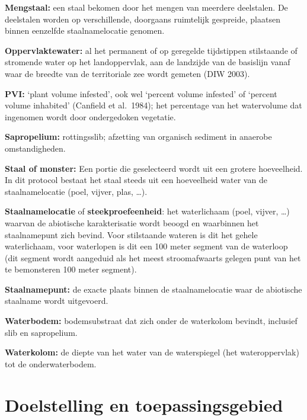 \documentclass[
]{scrreprt}
\begin{document}
\textbf{Mengstaal:} een staal bekomen door het mengen van meerdere deelstalen. De deelstalen worden op verschillende, doorgaans ruimtelijk gespreide, plaatsen binnen eenzelfde staalnamelocatie genomen.

\textbf{Oppervlaktewater:} al het permanent of op geregelde tijdstippen stilstaande of stromende water op het landoppervlak, aan de landzijde van de basislijn vanaf waar de breedte van de territoriale zee wordt gemeten (DIW 2003).

\textbf{PVI:} `plant volume infested', ook wel `percent volume infested' of `percent volume inhabited' (Canfield et al.~1984); het percentage van het watervolume dat ingenomen wordt door ondergedoken vegetatie.

\textbf{Sapropelium:} rottingsslib; afzetting van organisch sediment in anaerobe omstandigheden.

\textbf{Staal of monster:} Een portie die geselecteerd wordt uit een grotere hoeveelheid. In dit protocol bestaat het staal steeds uit een hoeveelheid water van de staalnamelocatie (poel, vijver, plas, \ldots).

\textbf{Staalnamelocatie} of \textbf{steekproefeenheid}: het waterlichaam (poel, vijver, \ldots) waarvan de abiotische karakterisatie wordt beoogd en waarbinnen het staalnamepunt zich bevind. Voor stilstaande wateren is dit het gehele waterlichaam, voor waterlopen is dit een 100 meter segment van de waterloop (dit segment wordt aangeduid als het meest stroomafwaarts gelegen punt van het te bemonsteren 100 meter segment).

\textbf{Staalnamepunt:} de exacte plaats binnen de staalnamelocatie waar de abiotische staalname wordt uitgevoerd.

\textbf{Waterbodem:} bodemsubstraat dat zich onder de waterkolom bevindt, inclusief slib en sapropelium.

\textbf{Waterkolom:} de diepte van het water van de waterspiegel (het wateroppervlak) tot de onderwaterbodem.

\section{Doelstelling en toepassingsgebied}\label{doelstelling-en-toepassingsgebied}
\end{document}
